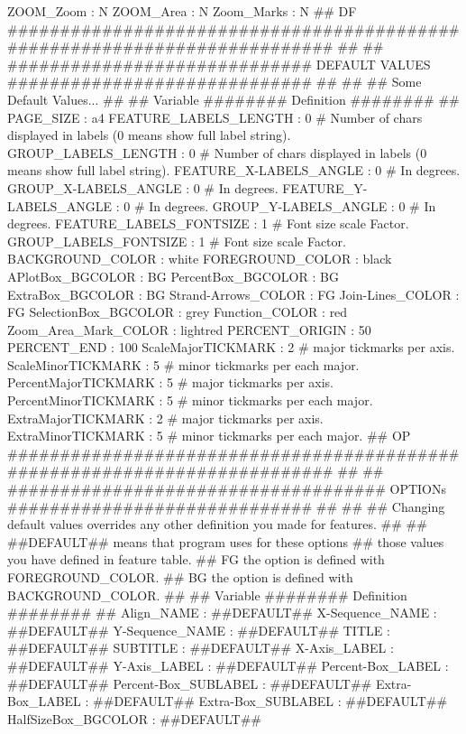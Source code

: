 \documentclass[11pt]{article}
\begin{document}
ZOOM_Zoom                 : N
ZOOM_Area                 : N
Zoom_Marks                : N
##
DF ########################################################################## ##
## ############################# DEFAULT VALUES ############################# ##
##
## Some Default Values...
##
## Variable ######## Definition ######## 
##
PAGE_SIZE               :  a4
FEATURE_LABELS_LENGTH   :  0     # Number of chars displayed in labels (0 means show full label string).
GROUP_LABELS_LENGTH     :  0     # Number of chars displayed in labels (0 means show full label string).
FEATURE_X-LABELS_ANGLE  :  0     # In degrees.
GROUP_X-LABELS_ANGLE    :  0     # In degrees.
FEATURE_Y-LABELS_ANGLE  :  0     # In degrees.
GROUP_Y-LABELS_ANGLE    :  0     # In degrees.
FEATURE_LABELS_FONTSIZE :  1     # Font size scale Factor.
GROUP_LABELS_FONTSIZE   :  1     # Font size scale Factor.
BACKGROUND_COLOR        : white
FOREGROUND_COLOR        : black
APlotBox_BGCOLOR        :  BG
PercentBox_BGCOLOR      :  BG
ExtraBox_BGCOLOR        :  BG
Strand-Arrows_COLOR     :  FG
Join-Lines_COLOR        :  FG
SelectionBox_BGCOLOR    : grey
Function_COLOR          : red
Zoom_Area_Mark_COLOR    : lightred
PERCENT_ORIGIN          :  50
PERCENT_END             : 100
ScaleMajorTICKMARK      :   2    # major tickmarks per axis.
ScaleMinorTICKMARK      :   5    # minor tickmarks per each major.
PercentMajorTICKMARK    :   5    # major tickmarks per axis.
PercentMinorTICKMARK    :   5    # minor tickmarks per each major.
ExtraMajorTICKMARK      :   2    # major tickmarks per axis.
ExtraMinorTICKMARK      :   5    # minor tickmarks per each major.
##
OP ########################################################################## ##
## #################################### OPTIONs ############################# ##
##
## Changing default values overrides any other definition you made for features.
##
##   ##DEFAULT##  means that program uses for these options
##                those values you have defined in feature table.
##         FG    the option is defined with FOREGROUND_COLOR.
##         BG    the option is defined with BACKGROUND_COLOR.
##
## Variable ######## Definition ######## 
##
Align_NAME            : ##DEFAULT##
X-Sequence_NAME       : ##DEFAULT##
Y-Sequence_NAME       : ##DEFAULT##
TITLE                 : ##DEFAULT##
SUBTITLE              : ##DEFAULT##
X-Axis_LABEL          : ##DEFAULT##
Y-Axis_LABEL          : ##DEFAULT##
Percent-Box_LABEL     : ##DEFAULT##
Percent-Box_SUBLABEL  : ##DEFAULT##
Extra-Box_LABEL       : ##DEFAULT##
Extra-Box_SUBLABEL    : ##DEFAULT##
HalfSizeBox_BGCOLOR   : ##DEFAULT##
\end{document}
